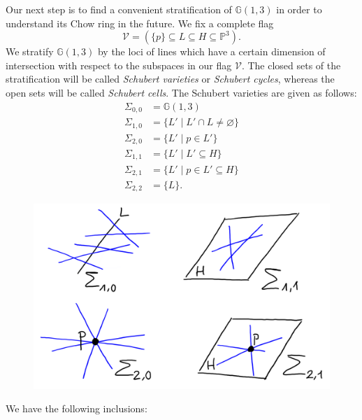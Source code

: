 \documentclass[12pt,a4paper]{amsart}
\theoremstyle{plain}
\theoremstyle{definition}
\theoremstyle{remark}
\begin{document}
Our next step is to find a convenient stratification of $\mathbb{G}(1,3)$ in order to understand its Chow ring in the future.
We fix a complete flag
\[ \mathcal{V}=(\{p\}\subseteq L\subseteq H\subseteq \mathbb{P}^{3}). \]
We stratify $\mathbb{G}(1,3)$ by the loci of lines which have a certain dimension of intersection with respect to the subspaces in our flag $\mathcal{V}$.
The closed sets of the stratification will be called \textit{Schubert varieties} or \textit{Schubert cycles}, whereas the open sets will be called \textit{Schubert cells}.
The Schubert varieties are given as follows:
\begin{align*}
    \Sigma_{0,0} & =\mathbb{G}(1,3) \\
    \Sigma_{1,0} & =\{ L'\mid L'\cap L\neq \varnothing\} \\
    \Sigma_{2,0} & =\{ L'\mid p\in L'\} \\
    \Sigma_{1,1} & =\{ L'\mid L'\subseteq H\} \\
    \Sigma_{2,1} & =\{ L'\mid p\in L'\subseteq H\} \\
    \Sigma_{2,2} & =\{ L\}.
\end{align*}

\begin{figure}[H]
    \centering
    \includegraphics[scale=.75]{pictures/schubertcycles}
\end{figure}

We have the following inclusions:
\begin{center}
\end{center}
\end{document}
